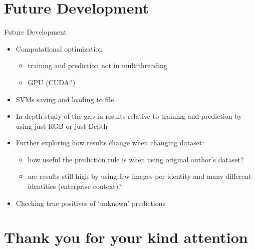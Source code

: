 \documentclass[unknownkeysallowed]{beamer}
\begin{document}
\section{Future Development}
\begin{frame}{Future Development}
	\begin{itemize}
		\item Computational optimization
			\begin{itemize}
				\item training and prediction not in multithreading
				\item GPU (CUDA?)
			\end{itemize}
		\item SVMs saving and loading to file
		\item In depth study of the gap in results relative to training	and prediction by using just RGB or just Depth
		\item Further exploring how results change when changing dataset:
			\begin{itemize}
				\item how useful the prediction rule is when using original author's dataset?
				\item are results still high by using few images per identity and many different identities (enterprise context)?
			\end{itemize}
		\item Checking true positives of `unknown' predictions

	\end{itemize}
\end{frame}

\section*{Thank you for your kind attention}
\end{document}
